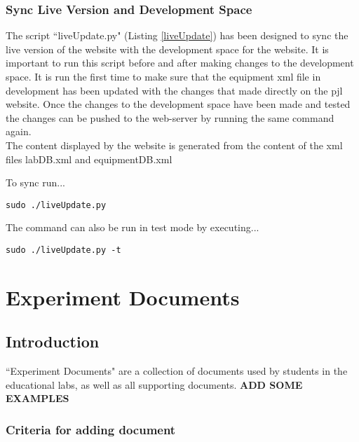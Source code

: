\documentclass[justified]{book}
\begin{document}
\subsection{Sync Live Version and Development Space}\label{sec:sync}

The script ``liveUpdate.py" (Listing \ref{liveUpdate}) has been designed to sync the live version of the website with the development space for the website. It is important to run this script before and after making changes to the development space. It is run the first time to make sure that the equipment xml file in development has been updated with the changes that made directly on the pjl website. Once the changes to the development space have been made and tested the changes can be pushed to the web-server by running the same command again.\\

The content displayed by the website is generated from the content of the xml files labDB.xml and equipmentDB.xml 

\vspace{12pt}
\noindent To sync run...
\begin{lstlisting}[backgroundcolor = \color{light-gray}]
sudo ./liveUpdate.py
\end{lstlisting}

\noindent The command can also be run in test mode by executing...

\begin{lstlisting}[backgroundcolor = \color{light-gray}]
sudo ./liveUpdate.py -t
\end{lstlisting}


\chapter{Experiment Documents}

\section{Introduction}

``Experiment Documents" are a collection of documents used by students in the educational labs, as well as all supporting documents. {\bf ADD SOME EXAMPLES} \\

\subsection{Criteria for adding document}
\end{document}
